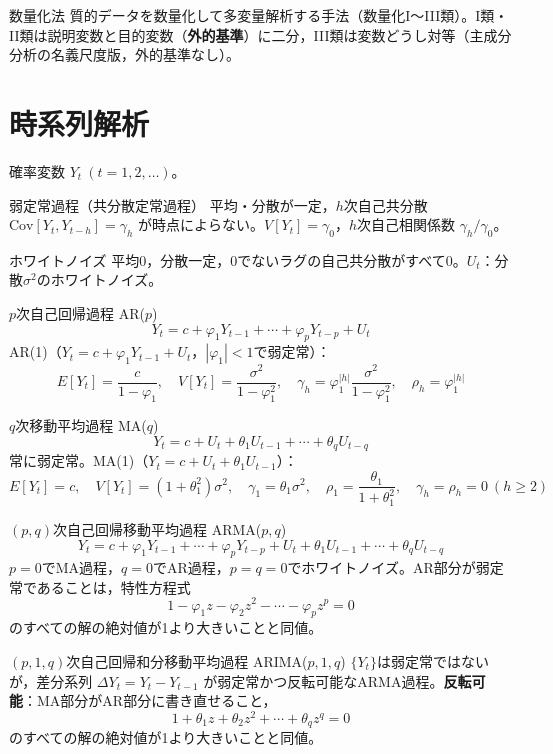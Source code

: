 \documentclass[a4paper,11pt]{ltjsarticle}
\newcommand{\Cov}{\mathrm{Cov}}
\begin{document}
\begin{term}{数量化法}
質的データを数量化して多変量解析する手法（数量化I〜III類）。I類・II類は説明変数と目的変数（\textbf{外的基準}）に二分，III類は変数どうし対等（主成分分析の名義尺度版，外的基準なし）。
\end{term}

\section{時系列解析}

確率変数 $Y_t\ (t=1,2,\dots)$。

\begin{term}{弱定常過程（共分散定常過程）}
平均・分散が一定，$h$次自己共分散 $\Cov[Y_t,Y_{t-h}]=\gamma_h$ が時点によらない。$V[Y_t]=\gamma_0$，$h$次自己相関係数 $\gamma_h/\gamma_0$。
\end{term}

\begin{term}{ホワイトノイズ}
平均0，分散一定，0でないラグの自己共分散がすべて0。$U_t$：分散$\sigma^2$のホワイトノイズ。
\end{term}

\begin{term}{$p$次自己回帰過程 AR($p$)}
\[
Y_t = c+\varphi_1Y_{t-1}+\cdots+\varphi_pY_{t-p}+U_t
\]
AR(1)（$Y_t=c+\varphi_1Y_{t-1}+U_t$，$|\varphi_1|<1$で弱定常）：
\[
E[Y_t]=\frac{c}{1-\varphi_1},\quad
V[Y_t]=\frac{\sigma^2}{1-\varphi_1^2},\quad
\gamma_h=\varphi_1^{|h|}\frac{\sigma^2}{1-\varphi_1^2},\quad
\rho_h=\varphi_1^{|h|}
\]
\end{term}

\begin{term}{$q$次移動平均過程 MA($q$)}
\[
Y_t = c+U_t+\theta_1U_{t-1}+\cdots+\theta_qU_{t-q}
\]
常に弱定常。MA(1)（$Y_t=c+U_t+\theta_1U_{t-1}$）：
\[
E[Y_t]=c,\quad V[Y_t]=(1+\theta_1^2)\sigma^2,\quad
\gamma_1=\theta_1\sigma^2,\quad
\rho_1=\frac{\theta_1}{1+\theta_1^2},\quad \gamma_h=\rho_h=0\ (h\ge2)
\]
\end{term}

\begin{term}{$(p,q)$次自己回帰移動平均過程 ARMA($p,q$)}
\[
Y_t = c+\varphi_1Y_{t-1}+\cdots+\varphi_pY_{t-p}+U_t+\theta_1U_{t-1}+\cdots+\theta_qU_{t-q}
\]
$p=0$でMA過程，$q=0$でAR過程，$p=q=0$でホワイトノイズ。AR部分が弱定常であることは，特性方程式
\[
1-\varphi_1z-\varphi_2z^2-\cdots-\varphi_pz^p = 0
\]
のすべての解の絶対値が1より大きいことと同値。
\end{term}

\begin{term}{$(p,1,q)$次自己回帰和分移動平均過程 ARIMA($p,1,q$)}
$\{Y_t\}$は弱定常ではないが，差分系列 $\Delta Y_t=Y_t-Y_{t-1}$ が弱定常かつ反転可能なARMA過程。\textbf{反転可能}：MA部分がAR部分に書き直せること，
\[
1+\theta_1z+\theta_2z^2+\cdots+\theta_qz^q = 0
\]
のすべての解の絶対値が1より大きいことと同値。
\end{term}
\end{document}
